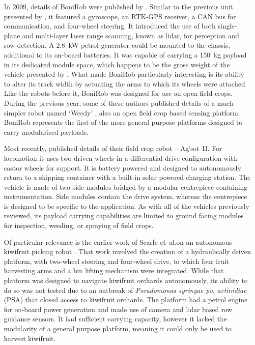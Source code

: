 \documentclass[preprint,authoryear,12pt]{elsarticle}
\begin{document}
        In 2009, details of BoniRob were published by \cite{Ruckelshausen2009}.
        Similar to the previous unit presented by \cite{Bak2004}, it featured a gyroscope, an RTK-GPS receiver, a CAN bus for communication, and four-wheel steering.
        It introduced the use of both single-plane and multi-layer laser range scanning, known as lidar, for perception and row detection.
        A \SI{2.8}{\kilo\watt} petrol generator could be mounted to the chassis, additional to its on-board batteries.
        It was capable of carrying a \SI{150}{\kilo\gram} payload in its dedicated module space, which happens to be the gross weight of the vehicle presented by \cite{Bak2004}.
        What made BoniRob particularly interesting is its ability to alter its track width by actuating the arms to which its wheels were attached.
        Like the robots before it, BoniRob was designed for use on open field crops.
        During the previous year, some of these authors published details of a much simpler robot named `Weedy' \citep{Klose2008}, also an open field crop based sensing platform.
        BoniRob represents the first of the more general purpose platforms designed to carry modularised payloads.


        Most recently, \cite{Bawden2017} published details of their field crop robot -- Agbot~II.
        For locomotion it uses two driven wheels in a differential drive configuration with castor wheels for support.
        It is battery powered and designed to autonomously return to a shipping container with a built-in solar powered charging station.
        The vehicle is made of two side modules bridged by a modular centrepiece containing instrumentation.
        Side modules contain the drive system, whereas the centrepiece is designed to be specific to the application.
        As with all of the vehicles previously reviewed, its payload carrying capabilities are limited to ground facing modules for inspection, weeding, or spraying of field crops.


        Of particular relevance is the earlier work of Scarfe et~al.\@ on an autonomous kiwifruit picking robot \citep{scarfe2009, Scarfe2012}.
        That work involved the creation of a hydraulically driven platform, with two-wheel steering and four-wheel drive, to which four fruit harvesting arms and a bin lifting mechanism were integrated.
        While that platform was designed to navigate kiwifruit orchards autonomously, its ability to do so was not tested due to an outbreak of \textit{Pseudomonas syringae pv. actinidiae} (PSA) that closed access to kiwifruit orchards.
        The platform had a petrol engine for on-board power generation and made use of camera and lidar based row guidance sensors.
        It had sufficient carrying capacity, however it lacked the modularity of a general purpose platform, meaning it could only be used to harvest kiwifruit.
\end{document}
